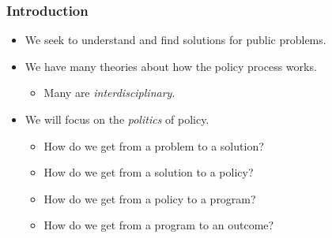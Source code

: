 \documentclass[10pt]{beamer}
\begin{document}
\begin{frame}
\frametitle{Introduction}

\begin{itemize}
\item<1-> We seek to understand and find solutions for public problems.

\item<2-> We have many theories about how the policy process works.
\begin{itemize}
\item Many are \emph{interdisciplinary}.
\end{itemize}

\item<3-> We will focus on the \emph{politics} of policy.
\begin{itemize}
\item How do we get from a problem to a solution?
\item How do we get from a solution to a policy?
\item How do we get from a policy to a program?
\item How do we get from a program to an outcome?
\end{itemize}
\end{itemize}

\end{frame}
\end{document}
